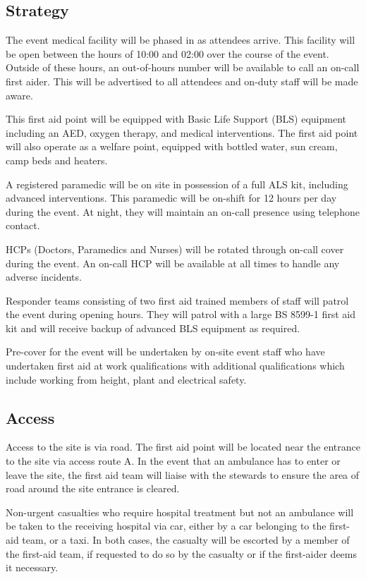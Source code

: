 \subsection{Strategy}
The event medical facility will be phased in as attendees arrive. This facility will
be open between the hours of 10:00 and 02:00 over the course of the event. Outside
of these hours, an out-of-hours number will be available to call an on-call first aider.
This will be advertised to all attendees and on-duty staff will be made aware.

This first aid point will be equipped with Basic Life Support (BLS) equipment including
an AED, oxygen therapy, and medical interventions. The first aid point will also operate as
a welfare point, equipped with bottled water, sun cream, camp beds and heaters.

A registered paramedic will be on site in possession of a full ALS kit, including advanced
interventions. This paramedic will be on-shift for 12 hours per day during the event. At
night, they will maintain an on-call presence using telephone contact.

HCPs (Doctors, Paramedics and Nurses) will be rotated through on-call cover during the
event. An on-call HCP will be available at all times to handle any adverse incidents.

Responder teams consisting of two first aid trained members of staff will patrol the event
during opening hours. They will patrol with a large BS 8599-1 first aid kit and will receive
backup of advanced BLS equipment as required.

Pre-cover for the event will be undertaken by on-site event staff who have undertaken first aid
at work qualifications with additional qualifications which include working from height, plant
and electrical safety.

\subsection{Access}

Access to the site is via road. The first aid point will be located near the
entrance to the site via access route A. In the event that an ambulance has
to enter or leave the site, the first aid team will liaise with the stewards to ensure
the area of road around the site entrance is cleared.

Non-urgent casualties who require hospital treatment but not an ambulance will
be taken to the receiving hospital via car, either by a car belonging to the
first-aid team, or a taxi. In both cases, the casualty will be escorted by a
member of the first-aid team, if requested to do so by the casualty or if the
first-aider deems it necessary.

